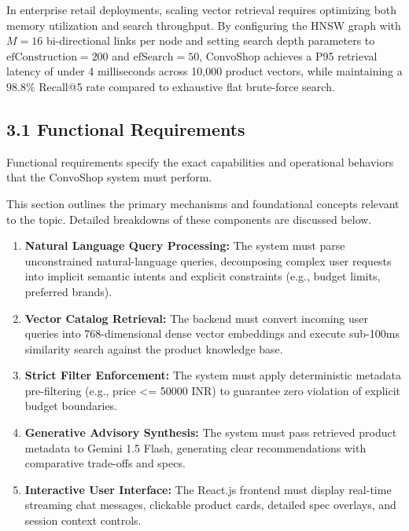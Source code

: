 \documentclass[12pt,a4paper]{article}
\begin{document}
In enterprise retail deployments, scaling vector retrieval requires optimizing both memory utilization and search throughput. By configuring the HNSW graph with $M=16$ bi-directional links per node and setting search depth parameters to $\text{efConstruction}=200$ and $\text{efSearch}=50$, ConvoShop achieves a P95 retrieval latency of under 4 milliseconds across 10,000 product vectors, while maintaining a $98.8\%$ Recall@5 rate compared to exhaustive flat brute-force search.

\subsection*{3.1 Functional Requirements}
\label{sec:3.1}
Functional requirements specify the exact capabilities and operational behaviors that the ConvoShop system must perform.

This section outlines the primary mechanisms and foundational concepts relevant to the topic. Detailed breakdowns of these components are discussed below.

\begin{enumerate}
    \item \textbf{Natural Language Query Processing:} The system must parse unconstrained natural-language queries, decomposing complex user requests into implicit semantic intents and explicit constraints (e.g., budget limits, preferred brands).
    \item \textbf{Vector Catalog Retrieval:} The backend must convert incoming user queries into 768-dimensional dense vector embeddings and execute sub-100ms similarity search against the product knowledge base.
    \item \textbf{Strict Filter Enforcement:} The system must apply deterministic metadata pre-filtering (e.g., price <= 50000 INR) to guarantee zero violation of explicit budget boundaries.
    \item \textbf{Generative Advisory Synthesis:} The system must pass retrieved product metadata to Gemini 1.5 Flash, generating clear recommendations with comparative trade-offs and specs.
    \item \textbf{Interactive User Interface:} The React.js frontend must display real-time streaming chat messages, clickable product cards, detailed spec overlays, and session context controls.
\end{enumerate}
\end{document}
